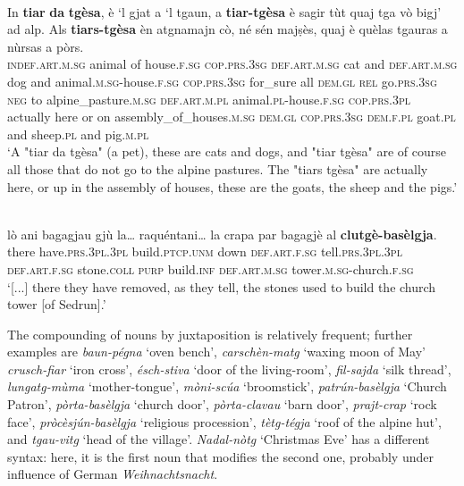 \ea\label{ex:tiartgèsa1}
\\
\gll  In \textbf{tiar} \textbf{da} \textbf{tgèsa}, è `l gjat a `l tgaun, a \textbf{tiar-tgèsa} è sagir tùt quaj tga vò bigj’ ad alp. Als \textbf{tiars-tgèsa} èn atgnamajn cò, né sén majṣès, quaj è quèlas tgauras a nùrsas a pòrs.  \\
\textsc{indef.art.m.sg} animal of house.\textsc{f.sg} \textsc{cop.prs.3sg} \textsc{def.art.m.sg} cat and \textsc{def.art.m.sg} dog  and animal.\textsc{m.sg}-house.\textsc{f.sg} \textsc{cop.prs.3sg} for\_sure all \textsc{dem.gl} \textsc{rel} go.\textsc{prs.3sg} \textsc{neg} to alpine\_pasture.\textsc{m.sg} \textsc{def.art.m.pl} animal.\textsc{pl}-house.\textsc{f.sg} \textsc{cop.prs.3pl} actually here or on assembly\_of\_houses.\textsc{m.sg} \textsc{dem.gl} \textsc{cop.prs.3sg} \textsc{dem.f.pl} goat.\textsc{pl} and sheep.\textsc{pl} and pig.\textsc{m.pl}\\
\glt `A "tiar da tgèsa" (a pet), these are cats and dogs, and "tiar tgèsa" are of course all those that do not go to the alpine pastures. The "tiars tgèsa" are actually here, or up in the assembly of houses, these are the goats, the sheep and the pigs.'
\z


\ea
\label{ex:clutgebaselgja1}
\\
\gll[...] lò ani bagagjau gjù la… raquéntani… la crapa par bagagjè al \textbf{clutgè-basèlgja}.\\
{} there have.\textsc{prs.3pl.3pl} build.\textsc{ptcp.unm} down \textsc{def.art.f.sg} tell.\textsc{prs.3pl.3pl} \textsc{def.art.f.sg} stone.\textsc{coll} \textsc{purp} build.\textsc{inf}  \textsc{def.art.m.sg} tower.\textsc{m.sg}-church.\textsc{f.sg}  \\
\glt `[...] there they have removed, as they tell, the stones used to build the church tower [of Sedrun].'
\z

The compounding of nouns by juxtaposition is relatively frequent; further examples are \textit{baun-pégna} `oven bench', \textit{carschèn-matg} `waxing moon of May' \textit{crusch-fiar} `iron cross', \textit{ésch-stiva} `door of the living-room', \textit{fil-sajda} `silk thread', \textit{lungatg-mùma} `mother-tongue', \textit{mòni-scúa} `broomstick', \textit{patrún-basèlgja} `Church Patron', \textit{pòrta-basèlgja} `church door', \textit{pòrta-clavau} `barn door', \textit{prajt-crap} `rock face', \textit{pròcèsjún-basèlgja} `religious procession', \textit{tètg-tégja} `roof of the alpine hut', and \textit{tgau-vitg} `head of the village'. \textit{Nadal-nòtg} `Christmas Eve' has a different syntax: here, it is the first noun that modifies the second one, probably under influence of German \textit{Weihnachtsnacht}.

